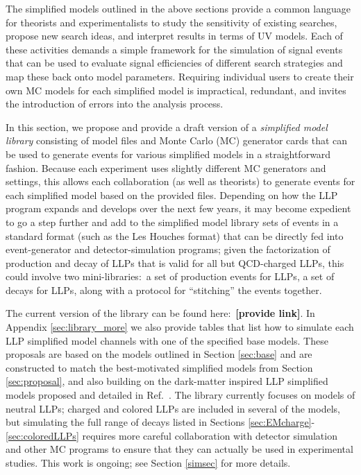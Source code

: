 The simplified models outlined in the above sections provide a common language for theorists and experimentalists to study the sensitivity of existing searches, propose new search ideas, and interpret results in terms of UV models. Each of these activities demands a simple framework for the simulation of signal events that can be used to evaluate signal efficiencies of different search strategies and map these back onto model parameters. Requiring individual users to create their own MC models for each simplified model is impractical, redundant, and invites the introduction of errors into the analysis process.

In this section, we propose and provide a draft version of a \emph{simplified model library} consisting of model files and Monte Carlo (MC) generator cards that can be used to generate events for various simplified models in a straightforward fashion. Because each experiment uses slightly different MC generators and settings, this allows each collaboration (as well as theorists) to generate events for each simplified model based on the provided files. Depending on how the LLP program expands and develops over the next few years, it may become expedient to go a step further and add to the simplified model library sets of events in a standard format (such as the Les Houches format) that can be directly fed into event-generator and detector-simulation programs; given the factorization of production and decay of LLPs that is valid for all but QCD-charged LLPs, this could involve two mini-libraries:~a set of production events for LLPs, a set of decays for LLPs, along with a protocol for ``stitching'' the events together.

The current version of the library can be found here:~{\bf [provide link]}. In Appendix \ref{sec:library_more} we also provide tables that list how to simulate each LLP simplified model channels with one of the specified base models. These proposals are based on the models outlined in Section \ref{sec:base} and are constructed to match the best-motivated simplified models from Section \ref{sec:proposal}, and also building on the dark-matter inspired LLP simplified models proposed and detailed in Ref.~\cite{Buchmueller:2017uqu}.  The library currently focuses on models of neutral LLPs; charged and colored LLPs are included in several of the models, but  simulating the full range of decays listed in Sections \ref{sec:EMcharge}-\ref{sec:coloredLLPs} requires more careful collaboration with detector simulation and other MC programs to ensure that they can actually be used in experimental studies. This work is ongoing; see Section \ref{simsec} for more details.

